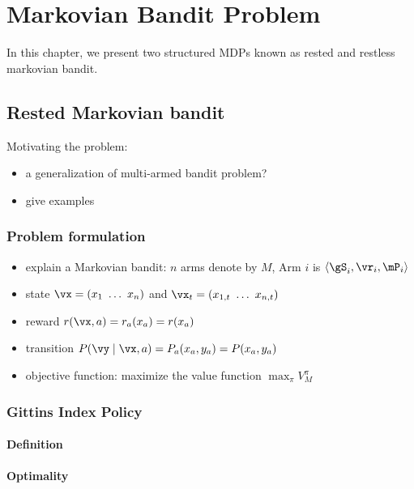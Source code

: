 \chapter{Markovian Bandit Problem}
\label{ch:mb_problem}

In this chapter, we present two structured MDPs known as rested and restless markovian bandit.

\section{Rested Markovian bandit}
\label{sec:rested_mab_pb}

Motivating the problem:
\begin{itemize}
    \item a generalization of multi-armed bandit problem?
    \item give examples
\end{itemize}

\subsection{Problem formulation}
\label{subsec:rested_pb_formul}

\begin{itemize}
    \item explain a Markovian bandit: $n$ arms denote by $M$, Arm $i$ is $\langle\gS_i, \vr_i,\mP_i\rangle$
    \item state $\vx=(x_1\ \dots\ x_n)$ and $\vx_t=(x_{1,t}\ \dots\ x_{n,t})$
    \item reward $r(\vx, a)=r_a(x_a)=r(x_a)$
    \item transition $P(\vy \mid\vx,a)=P_a(x_a,y_a)=P(x_a,y_a)$
    \item objective function: maximize the value function $\max_{\pi}V^\pi_M$ 
\end{itemize}

\subsection{Gittins Index Policy}
\label{subsec:gittins_idx}

\subsubsection{Definition}

\subsubsection{Optimality}

